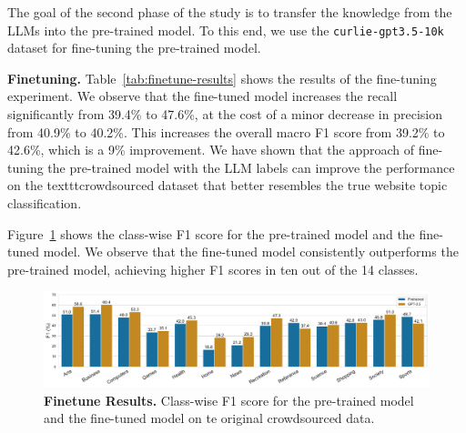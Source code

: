 
The goal of the second phase of the study is to transfer the knowledge from the LLMs into the pre-trained model. 
To this end, we use the \texttt{curlie-gpt3.5-10k} dataset for fine-tuning the pre-trained model.


\textbf{Finetuning.} Table~\ref{tab:finetune-results} shows the results of the fine-tuning experiment. 
We observe that the fine-tuned model increases the recall significantly from 39.4\% to 47.6\%, at the cost of a minor decrease in precision from 40.9\% to 40.2\%. 
This increases the overall macro F1 score from 39.2\% to 42.6\%, which is a 9\% improvement. 
We have shown that the approach of fine-tuning the pre-trained model with the LLM labels can improve the performance on the texttt{crowdsourced} dataset that better resembles the true website topic classification.




Figure~\ref{fig:finetune-results} shows the class-wise F1 score for the pre-trained model and the fine-tuned model. We observe that the fine-tuned model consistently outperforms the pre-trained model, achieving higher F1 scores in ten out of the 14 classes.


\begin{figure}
    \centering
    \includegraphics[width=\textwidth]{./figures/exp2-mf1.pdf}
    \caption{\textbf{Finetune Results.} Class-wise F1 score for the pre-trained model and the fine-tuned model on te original crowdsourced data.}
    \label{fig:finetune-results}
\end{figure}
